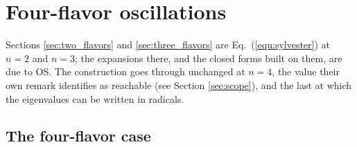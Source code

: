 \documentclass[final,5p,times,twocolumn,sort,compress]{elsarticle}
\newcommand{\eq}{Eq.}
\newcommand{\equ}[1]{\eq~(\ref{equ:#1})}
\begin{document}

\section{Four-flavor oscillations}
\label{sec:four_flavors}

Sections \ref{sec:two_flavors} and \ref{sec:three_flavors} are \equ{sylvester} at $n=2$ and $n=3$; the expansions there, and the closed forms built on them, are due to OS.  The construction goes through unchanged at $n=4$, the value their own remark identifies as reachable (see Section \ref{sec:scope}), and the last at which the eigenvalues can be written in radicals.


\subsection{The four-flavor case}
\label{sec:4nu_case}
\end{document}
